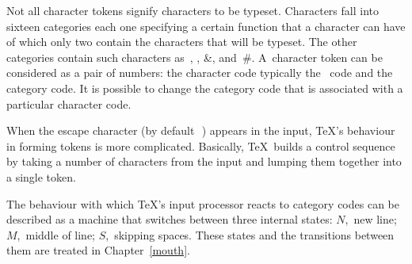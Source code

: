 \documentclass{book}
\begin{document}
Not all character tokens signify characters to be typeset.
\altt
Characters fall into sixteen categories \ldash each one
specifying a certain function that a character can have \rdash 
of which only two contain the characters that will be
typeset. The other categories contain such characters 
as~, , 
\n\&, and~\n\#. A~character token can be considered
as a pair of numbers: the character code \ldash typically the \ascii\
code \rdash  and the category code.
It is possible to change
the category code that is associated with a particular
character code.

When the escape character (by default~\cs{}$\,$) appears in the input,
\TeX's behaviour in forming tokens is more complicated. 
Basically,
\TeX\ builds a control sequence by taking a number of characters
from the input and lumping them together into a single token.

The behaviour with which \TeX's input processor 
reacts to category codes can be described
as a machine that switches between three internal states:
$N$,~new line; $M$,~middle of line; $S$,~skipping spaces.
These states and the transitions between them are treated
in Chapter~\ref{mouth}.

\end{document}
